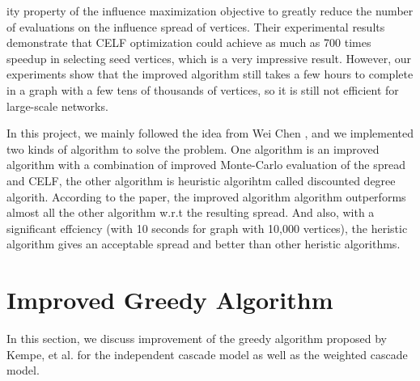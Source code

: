 \documentclass[journal,twoside,web]{ieeecolor}
\begin{document}
ity property of the influence maximization objective to greatly reduce the number of evaluations on the influence spread of vertices. Their experimental results demonstrate that CELF optimization could achieve as much as 700 times speedup in selecting seed
vertices, which is a very impressive result. However, our experiments show that the improved algorithm still takes a few hours to complete in a graph with a few tens of thousands of vertices, so it is still not efficient for large-scale networks.\par
In this project, we mainly followed the idea from Wei Chen \cite{Chen2009}, and we implemented two kinds of algorithm to solve the problem. One algorithm is an improved algorithm with a combination of improved Monte-Carlo evaluation of the spread and CELF, the other algorithm is heuristic algorihtm called discounted degree algorith. According to the paper, the improved algorithm algorithm outperforms almost all the other algorithm w.r.t the resulting spread. And also, with a significant effciency (with 10 seconds for graph with 10,000 vertices), the heristic algorithm gives an acceptable spread and better than other heristic algorithms.

\section{Improved Greedy Algorithm}
In this section, we discuss improvement of the greedy algorithm proposed by Kempe, et al. \cite{Kempe2003} for the independent cascade model as well as the weighted cascade model.
\end{document}
